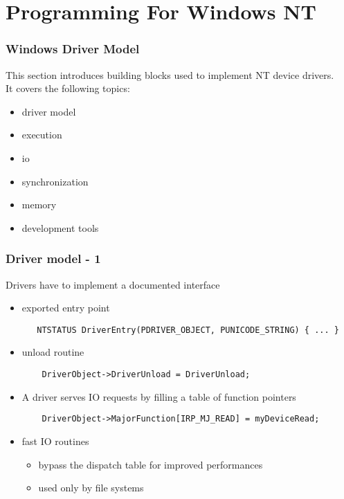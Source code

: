 %
%

\section{Programming For Windows NT}


\begin{frame}
  \frametitle{Windows Driver Model}

 This section introduces building blocks used to implement NT device drivers. \\
 It covers the following topics:
 \begin{itemize}
 \item
   driver model
 \item
   execution
 \item
   io
 \item
   synchronization
 \item
   memory 
 \item
   development tools
 \end{itemize}

\end{frame}


\begin{frame}[containsverbatim]
 \frametitle{Driver model - 1}

 Drivers have to implement a documented interface

 \begin{itemize}
  \item exported entry point

  \begin{verbatim}
   NTSTATUS DriverEntry(PDRIVER_OBJECT, PUNICODE_STRING) { ... }
  \end{verbatim}

  \item unload routine
   \begin{verbatim}
    DriverObject->DriverUnload = DriverUnload;
   \end{verbatim}

  \item A driver serves IO requests by filling a table of function pointers
   \begin{verbatim}
    DriverObject->MajorFunction[IRP_MJ_READ] = myDeviceRead;
   \end{verbatim}

  \item fast IO routines
  \begin{itemize}
   \item bypass the dispatch table for improved performances
   \item used only by file systems
  \end{itemize}

 \end{itemize}

\end{frame}

